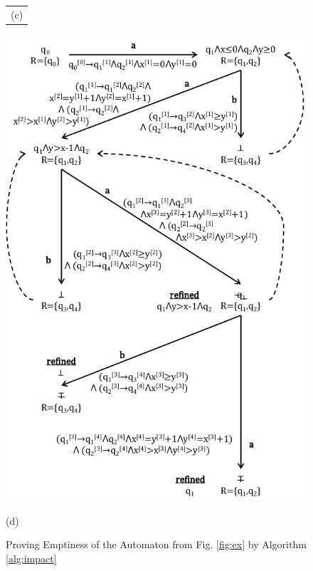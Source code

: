 \documentclass[10pt]{llncs}
\begin{document}
\begin{figure}[htb]
\begin{center}
\begin{minipage}{6cm}
\begin{tabular}{c}
\tiny{(c)}
\end{tabular}
\end{minipage}
\begin{minipage}{6cm}
\includegraphics[scale=0.60]{IM4.pdf}
\centerline{\tiny{(d)}}
\end{minipage}
\end{center}
\caption{Proving Emptiness of the Automaton from Fig. \ref{fig:ex}
  by Algorithm \ref{alg:impact}}
\label{fig:im}
\end{figure}
\end{document}
